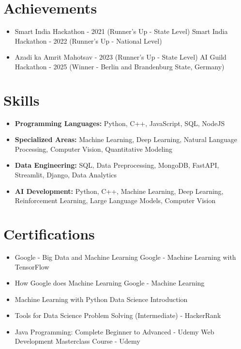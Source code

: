 \documentclass[a4paper,10pt]{article}
\begin{document}
\section*{Achievements}
\begin{itemize}
\item Smart India Hackathon - 2021 (Runner's Up - State Level) \hfill Smart India Hackathon - 2022 (Runner's Up - National Level)
\item Azadi ka Amrit Mahotsav - 2023 (Runner's Up - State Level) \hfill AI Guild Hackathon - 2025 (Winner - Berlin and Brandenburg State, Germany)
\end{itemize}

\section*{Skills}
\begin{itemize}
  \item \textbf{Programming Languages:} Python, C++, JavaScript, SQL, NodeJS
  \item \textbf{Specialized Areas:} Machine Learning, Deep Learning, Natural Language Processing, Computer Vision, Quantitative Modeling
  \item \textbf{Data Engineering:} SQL, Data Preprocessing, MongoDB, FastAPI, Streamlit, Django, Data Analytics
  \item \textbf{AI Development:} Python, C++, Machine Learning, Deep Learning, Reinforcement Learning, Large Language Models, Computer Vision
\end{itemize}

\section*{Certifications}
\begin{itemize}
\item Google - Big Data and Machine Learning \hfill Google - Machine Learning with TensorFlow
\item How Google does Machine Learning \hfill Google - Machine Learning
\item Machine Learning with Python \hfill Data Science Introduction
\item Tools for Data Science \hfill Problem Solving (Intermediate) - HackerRank
\item Java Programming: Complete Beginner to Advanced - Udemy \hfill Web Development Masterclass Course - Udemy
\end{itemize}
\end{document}
